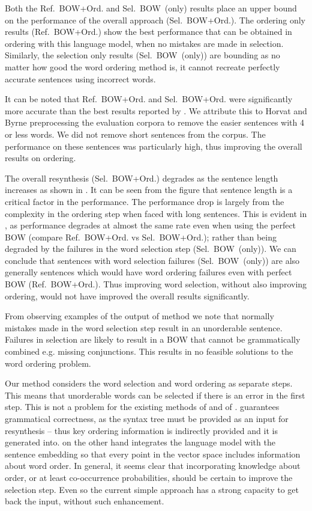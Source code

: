 \documentclass[compsoc]{IEEEtran}
\theoremstyle{plain}
\theoremstyle{definition}
\newcommand{\oracletitle}{Ref.~BOW+Ord.}
\newcommand{\selectiontitle}{Sel.~BOW~(only)}
\newcommand{\twosteptitle}{Sel.~BOW+Ord.}
\begin{document}
Both the \oracletitle{} and \selectiontitle{} results place an upper bound on the performance of the overall approach (\twosteptitle{}). The ordering only results (\oracletitle{}) show the best performance that can be obtained in ordering with this language model, when no mistakes are made in selection. Similarly, the selection only results (\selectiontitle{}) are bounding as no matter how good the word ordering method is, it cannot recreate perfectly accurate sentences using incorrect words.


It can be noted that \oracletitle{} and \twosteptitle{} were significantly more accurate than the best results reported by \textcite{Horvat2014}. We attribute this to Horvat and Byrne preprocessing the evaluation corpora to remove the easier sentences with 4 or less words. We did not remove short sentences from the corpus. The performance on these sentences was particularly high, thus improving the overall results on ordering.



The overall resynthesis (\twosteptitle{}) degrades as the sentence length increases as shown in . It can be seen from the figure that sentence length is a critical factor in the performance. The performance drop is largely from the complexity in the ordering step when faced with long sentences. This is evident in , as performance degrades at almost the same rate even when using the perfect BOW (compare \oracletitle{} vs \twosteptitle{}); rather than being degraded by the failures in the word selection step (\selectiontitle{}). We can conclude that sentences with word selection failures (\selectiontitle{}) are also generally sentences which would have word ordering failures even with perfect BOW (\oracletitle{}). Thus improving word selection, without also improving ordering, would not have improved the overall results significantly.

From observing examples of the output of method we note that normally mistakes made in the word selection step result in an unorderable sentence. Failures in selection are likely to result in a BOW that cannot be grammatically combined e.g. missing conjunctions. This results in no feasible solutions to the word ordering problem.


Our method considers the word selection and word ordering as separate steps. This means that unorderable words can be selected if there is an error in the first step. This is not a problem for the existing methods of \textcite{iyyer2014generating} and of \textcite{Bowman2015SmoothGeneration}. \textcite{iyyer2014generating} guarantees grammatical correctness, as the syntax tree must be provided as an input for resynthesis -- thus key ordering information is indirectly provided and it is generated into. \textcite{Bowman2015SmoothGeneration} on the other hand integrates the language model with the sentence embedding so that every point in the vector space includes information about word order. In general, it seems clear that incorporating knowledge about order, or at least co-occurrence probabilities, should be certain to improve the selection step. Even so the current simple approach has a strong capacity to get back the input, without such enhancement.
\end{document}
